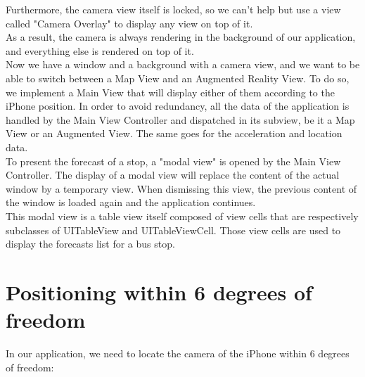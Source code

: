 Furthermore, the camera view itself is locked, so we can't help but use a view called "Camera Overlay" to display any view on top of it.\\

As a result, the camera is always rendering in the background of our application, and everything else is rendered on top of it.\\

Now we have a window and a background with a camera view, and we want to be able to switch between a Map View and an Augmented Reality View. To do so, we implement a Main View that will display either of them according to the iPhone position. In order to avoid redundancy, all the data of the application is handled by the Main View Controller and dispatched in its subview, be it a Map View or an Augmented View. The same goes for the acceleration and location data.\\

To present the forecast of a stop, a "modal view" is opened by the Main View Controller.  The display of a modal view will replace the content of the actual window by a temporary view. When dismissing this view, the previous content of the window is loaded again and the application continues.\\

This modal view is a table view itself composed of view cells that are respectively subclasses of UITableView and UITableViewCell. Those view cells are used to display the forecasts list for a bus stop.

\section{Positioning within 6 degrees of freedom}

In our application, we need to locate the camera of the iPhone within 6 degrees of freedom:

\vspace{10pt}

